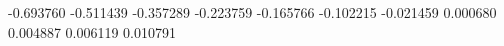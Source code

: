 -0.693760
-0.511439
-0.357289
-0.223759
-0.165766
-0.102215
-0.021459
0.000680
0.004887
0.006119
0.010791
